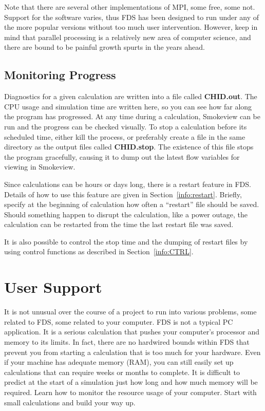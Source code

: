 \documentclass[11pt]{book}
\begin{document}
\begin{warning}
\noindent
Note that there are several other implementations of MPI, some free, some not.
Support for the software varies, thus FDS has been designed to run under any of the
more popular versions without too much user intervention. However, keep in mind
that parallel processing is a relatively new area of computer science,
and there are bound to be painful growth spurts in the years ahead.
\end{warning}


\section{Monitoring Progress}
Diagnostics for a given calculation are written into a file called {\bf CHID.out}.
The CPU usage and simulation time are written here, so you can see how
far along the program has progressed. At any time during a calculation,
Smokeview can be run and the progress can be checked visually.
To stop a calculation before its scheduled time, either
kill the process, or preferably create a file in the same directory as
the output files called {\bf CHID.stop}. The existence of this
file stops the program gracefully, causing it to dump out the
latest flow variables for viewing in Smokeview.

Since calculations can be hours or days long, there is a restart
feature in FDS. Details of how to use this feature
are given in Section~\ref{info:restart}. Briefly, specify at the
beginning of calculation how often a ``restart'' file should be saved.
Should something happen to disrupt the calculation, like a power
outage, the calculation can be restarted from the time the last restart
file was saved.

It is also possible to control the stop time and the dumping of restart files by using
control functions as described in Section~\ref{info:CTRL}.



\chapter{User Support}

It is not unusual over the course of a
project to run into various problems, some related to FDS, some related to your computer.
FDS is not a typical PC application. It is a serious calculation that pushes your computer's
processor and memory to its limits. In fact, there are no hardwired bounds within FDS that
prevent you from starting a calculation that is too much for your hardware.
Even if your machine has adequate memory (RAM), you can still easily set up calculations that can require
weeks or months to complete. It is difficult to predict at the start of a simulation just how long and
how much memory will be required. Learn how to monitor the resource usage of your computer.
Start with small calculations and build your way up.
\end{document}

